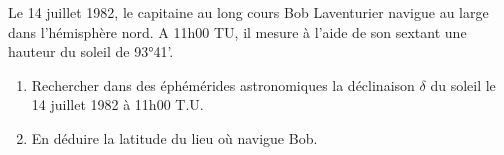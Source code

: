 
Le 14 juillet 1982, le capitaine au long cours Bob Laventurier navigue au large dans l’hémisphère nord.
A 11h00 TU, il mesure à l’aide de son sextant une hauteur du soleil de 93°41’.
\begin{enumerate}
\item Rechercher dans des éphémérides astronomiques la déclinaison $\delta$ du soleil le 14 juillet 1982 à 11h00
T.U.
\item En déduire la latitude du lieu où navigue Bob.
\end{enumerate}

